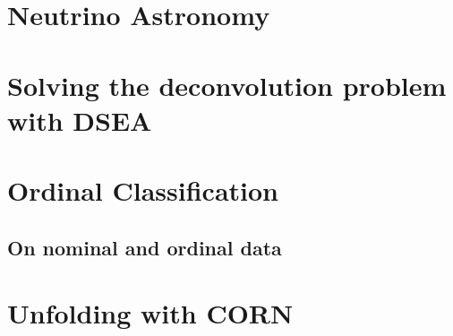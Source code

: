
\chapter{Neutrino Astronomy} \label{sec:neutrino_astronomy}
  
  
  
\chapter{Solving the deconvolution problem with DSEA} \label{sec:dsea}
  
  
  
\chapter{Ordinal Classification} \label{sec:ordinal}
  
  \section{On nominal and ordinal data}
  \blindtext[2]
  
\chapter{Unfolding with CORN} \label{sec:unfolding}
  
  
  
  
  
  

